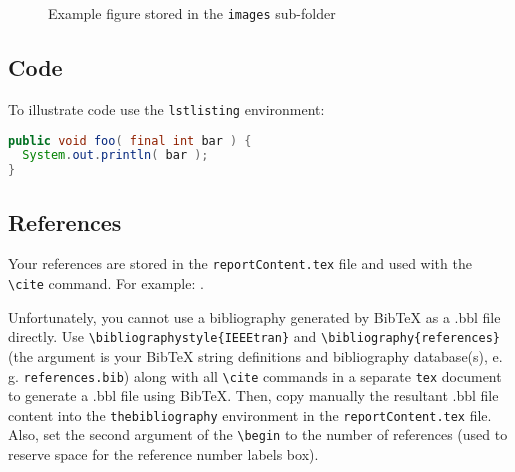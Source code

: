 \begin{figure}[tb]
\centering
    \qquad
\caption{Example figure stored in the \texttt{images} sub-folder}
\label{fig:example subfigure}
\end{figure}


\subsection*{Code}
To illustrate code use the \texttt{lstlisting} environment:
\begin{lstlisting}[language=Java]
public void foo( final int bar ) {
  System.out.println( bar );
}
\end{lstlisting}


\subsection*{References}
Your references are stored in the \texttt{reportContent.tex} file and used with the \texttt{\textbackslash cite} command. For example: \cite{IEEEhowto:kopka}.

Unfortunately, you cannot use a bibliography generated by BibTeX as a .bbl file directly. Use \texttt{\textbackslash bibliographystyle\{IEEEtran\}} and \texttt{\textbackslash bibliography\{references\}} (the argument is your BibTeX string definitions and bibliography database(s), e.\,g. \texttt{references.bib}) along with all \texttt{\textbackslash cite} commands in a separate \texttt{tex} document to generate a .bbl file using BibTeX. Then, copy manually the resultant .bbl file content into the \texttt{thebibliography} environment in the \texttt{reportContent.tex} file. Also, set the second argument of the \texttt{\textbackslash begin} to the number of references (used to reserve space for the reference number labels box).

\pagebreak